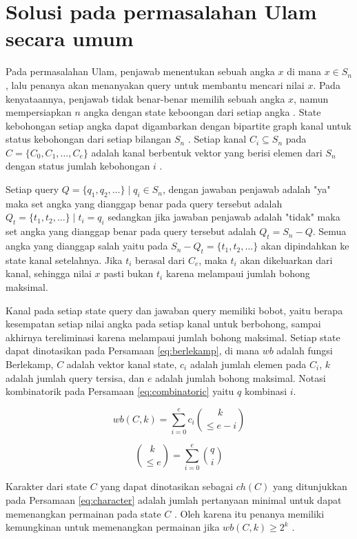 \section{Solusi pada permasalahan Ulam secara umum}

Pada permasalahan Ulam, penjawab menentukan sebuah angka $x$ di mana $x \in S_n$, lalu penanya akan menanyakan query untuk membantu mencari nilai $x$. Pada kenyataannya, penjawab tidak benar-benar memilih sebuah angka $x$, namun mempersiapkan $n$ angka dengan state keboongan dari setiap angka \cite{Pelc1987}. State kebohongan setiap angka dapat digambarkan dengan bipartite graph kanal untuk status kebohongan dari setiap bilangan $S_n$ \cite{Ahlswede2008}. Setiap kanal $C_i \subseteq S_n$ pada $C=\{C_0,C_1,\ldots,C_e\}$ adalah kanal berbentuk vektor yang berisi elemen dari $S_n$ dengan status jumlah kebohongan $i$ \cite{Ellis2005}.

Setiap query $Q=\{q_1,q_2,\ldots\} \mid q_i \in S_n$, dengan jawaban penjawab adalah "ya" maka set angka yang dianggap benar pada query tersebut adalah $Q_t=\{t_1,t_2,\ldots\} \mid t_i = q_i$ sedangkan jika jawaban penjawab adalah "tidak" maka set angka yang dianggap benar pada query tersebut adalah $Q_t=S_n-Q$. Semua angka yang dianggap salah yaitu pada $S_n-Q_t=\{t_1,t_2,\ldots\}$ akan dipindahkan ke state kanal setelahnya. Jika $t_i$ berasal dari $C_e$, maka $t_i$ akan dikeluarkan dari kanal, sehingga nilai $x$ pasti bukan $t_i$ karena melampaui jumlah bohong maksimal.

Kanal pada setiap state query dan jawaban query memiliki bobot, yaitu berapa kesempatan setiap nilai angka pada setiap kanal untuk berbohong, sampai akhirnya tereliminasi karena melampaui jumlah bohong maksimal. Setiap state dapat dinotasikan pada Persamaan \ref{eq:berlekamp}, di mana $wb$ adalah fungsi Berlekamp, $C$ adalah vektor kanal state, $c_i$ adalah jumlah elemen pada $C_i$, $k$ adalah jumlah query tersisa, dan $e$ adalah jumlah bohong maksimal. Notasi kombinatorik pada Persamaan \ref{eq:combinatoric} yaitu $q$ kombinasi $i$.

\begin{equation} \label{eq:berlekamp}
wb(C,k) = \sum^{e}_{i=0} c_i \binom{k}{\leq e-i}
\end{equation}

\begin{equation} \label{eq:combinatoric}
\binom{k}{\leq e} = \sum^{e}_{i=0} \binom{q}{i}
\end{equation}

Karakter dari state $C$  yang dapat dinotasikan sebagai $ch(C)$ yang ditunjukkan pada Persamaan \ref{eq:character} adalah jumlah pertanyaan minimal untuk dapat memenangkan permainan pada state $C$ \cite{Deppe2004}. Oleh karena itu penanya memiliki kemungkinan untuk memenangkan permainan jika $wb(C,k) \geq 2^k$ \cite{Ellis2005}.

